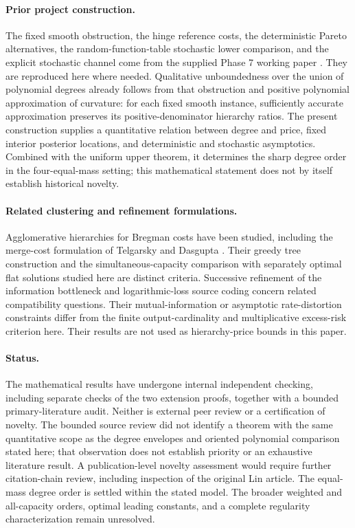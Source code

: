 \documentclass[11pt]{article}
\theoremstyle{definition}\newtheorem{definition}[theorem]{Definition}
\theoremstyle{remark}\newtheorem{remark}[theorem]{Remark}
\begin{document}
\paragraph{Prior project construction.}
The fixed smooth obstruction, the hinge reference costs, the deterministic Pareto alternatives, the random-function-table stochastic lower comparison, and the explicit stochastic channel come from the supplied Phase 7 working paper \cite[Section 4]{huang7}. They are reproduced here where needed. Qualitative unboundedness over the union of polynomial degrees already follows from that obstruction and positive polynomial approximation of curvature: for each fixed smooth instance, sufficiently accurate approximation preserves its positive-denominator hierarchy ratios. The present construction supplies a quantitative relation between degree and price, fixed interior posterior locations, and deterministic and stochastic asymptotics. Combined with the uniform upper theorem, it determines the sharp degree order in the four-equal-mass setting; this mathematical statement does not by itself establish historical novelty.

\paragraph{Related clustering and refinement formulations.}
Agglomerative hierarchies for Bregman costs have been studied, including the merge-cost formulation of Telgarsky and Dasgupta \cite{telgarsky}. Their greedy tree construction and the simultaneous-capacity comparison with separately optimal flat solutions studied here are distinct criteria.
Successive refinement of the information bottleneck \cite{charvin} and logarithmic-loss source coding \cite{no} concern related compatibility questions. Their mutual-information or asymptotic rate-distortion constraints differ from the finite output-cardinality and multiplicative excess-risk criterion here. Their results are not used as hierarchy-price bounds in this paper.

\paragraph{Status.}
The mathematical results have undergone internal independent checking, including separate checks of the two extension proofs, together with a bounded primary-literature audit. Neither is external peer review or a certification of novelty. The bounded source review did not identify a theorem with the same quantitative scope as the degree envelopes and oriented polynomial comparison stated here; that observation does not establish priority or an exhaustive literature result. A publication-level novelty assessment would require further citation-chain review, including inspection of the original Lin article. The equal-mass degree order is settled within the stated model. The broader weighted and all-capacity orders, optimal leading constants, and a complete regularity characterization remain unresolved.
\end{document}
